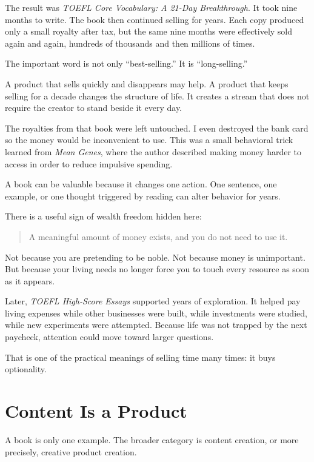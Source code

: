 The result was \emph{TOEFL Core Vocabulary: A 21-Day Breakthrough}. It took nine months to write. The book then continued selling for years. Each copy produced only a small royalty after tax, but the same nine months were effectively sold again and again, hundreds of thousands and then millions of times.

The important word is not only ``best-selling.'' It is ``long-selling.''

A product that sells quickly and disappears may help. A product that keeps selling for a decade changes the structure of life. It creates a stream that does not require the creator to stand beside it every day.

The royalties from that book were left untouched. I even destroyed the bank card so the money would be inconvenient to use. This was a small behavioral trick learned from \emph{Mean Genes}, where the author described making money harder to access in order to reduce impulsive spending.

A book can be valuable because it changes one action. One sentence, one example, or one thought triggered by reading can alter behavior for years.

There is a useful sign of wealth freedom hidden here:

\begin{quote}
A meaningful amount of money exists, and you do not need to use it.
\end{quote}

Not because you are pretending to be noble. Not because money is unimportant. But because your living needs no longer force you to touch every resource as soon as it appears.

Later, \emph{TOEFL High-Score Essays} supported years of exploration. It helped pay living expenses while other businesses were built, while investments were studied, while new experiments were attempted. Because life was not trapped by the next paycheck, attention could move toward larger questions.

That is one of the practical meanings of selling time many times: it buys optionality.

\section*{Content Is a Product}

A book is only one example. The broader category is content creation, or more precisely, creative product creation.

